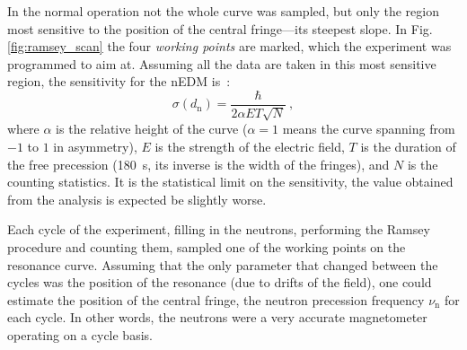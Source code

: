 In the normal operation not the whole curve was sampled, but only the region most sensitive to the position of the central fringe---its steepest slope. In Fig.\,\ref{fig:ramsey_scan} the four \emph{working points} are marked, which the experiment was programmed to aim at. Assuming all the data are taken in this most sensitive region, the sensitivity for the nEDM is~\cite{FertlThesis}:
\begin{equation}
  \sigma(d_\text{n}) = \frac{\hbar}{ 2 \alpha E T \sqrt{N} } \ ,
\end{equation}
where $\alpha$ is the relative height of the curve ($\alpha = 1$ means the curve spanning from $-1$ to $1$ in asymmetry), $E$ is the strength of the electric field, $T$ is the duration of the free precession (\SI{180}{\second}, its inverse is the width of the fringes), and $N$ is the counting statistics. It is the statistical limit on the sensitivity, the value obtained from the analysis is expected be slightly worse.

Each cycle of the experiment, filling in the neutrons, performing the Ramsey procedure and counting them, sampled one of the working points on the resonance curve. Assuming that the only parameter that changed between the cycles was the position of the resonance (due to drifts of the field), one could estimate the position of the central fringe, the neutron precession frequency $\nu_\text{n}$ for each cycle. In other words, the neutrons were a very accurate magnetometer operating on a cycle basis.

